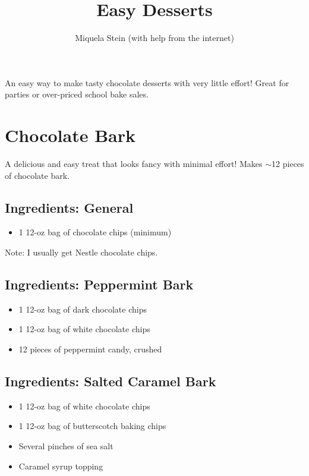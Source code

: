 \documentclass{article}
\begin{document}
\title{\vspace{-2.0cm}Easy Desserts}
\author{Miquela Stein (with help from the internet)}
\maketitle{}
An easy way to make tasty chocolate desserts with very little effort! Great for parties or over-priced school bake sales.

\section{Chocolate Bark}
A delicious and easy treat that looks fancy with minimal effort! Makes $\sim$12 pieces of chocolate bark.
\subsection{Ingredients: General}
\begin{itemize}
\item 1 12-oz bag of chocolate chips (minimum)
\end{itemize}
Note: I usually get Nestle chocolate chips.
\subsection{Ingredients: Peppermint Bark}
\begin{itemize}
\item 1 12-oz bag of dark chocolate chips
\item 1 12-oz bag of white chocolate chips
\item 12 pieces of peppermint candy, crushed
\end{itemize}
\subsection{Ingredients: Salted Caramel Bark}
\begin{itemize}
\item 1 12-oz bag of white chocolate chips
\item 1 12-oz bag of butterscotch baking chips
\item Several pinches of sea salt
\item Caramel syrup topping
\end{itemize}
\end{document}

